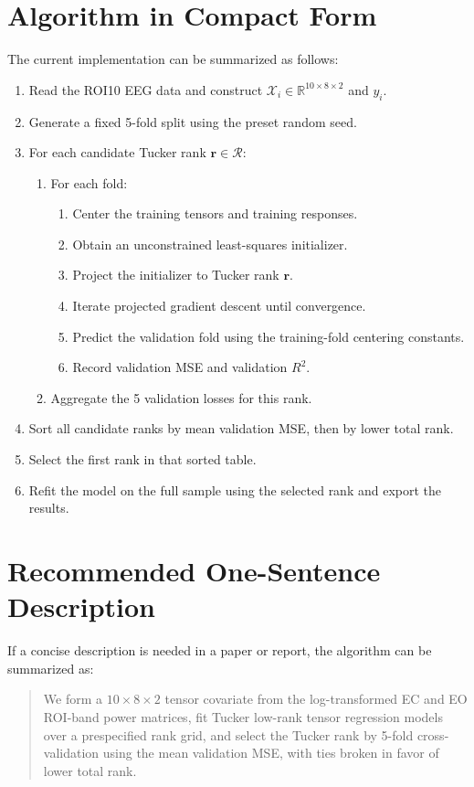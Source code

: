 \documentclass[11pt]{article}
\begin{document}
\section{Algorithm in Compact Form}
The current implementation can be summarized as follows:
\begin{enumerate}[leftmargin=2em,label=\arabic*.]
\item Read the ROI10 EEG data and construct $\mathcal X_i\in\mathbb{R}^{10\times 8\times 2}$ and $y_i$.
\item Generate a fixed 5-fold split using the preset random seed.
\item For each candidate Tucker rank $\mathbf r\in\mathcal R$:
\begin{enumerate}[leftmargin=2em,label*=\arabic*.]
\item For each fold:
\begin{enumerate}[leftmargin=2em,label*=\arabic*.]
\item Center the training tensors and training responses.
\item Obtain an unconstrained least-squares initializer.
\item Project the initializer to Tucker rank $\mathbf r$.
\item Iterate projected gradient descent until convergence.
\item Predict the validation fold using the training-fold centering constants.
\item Record validation MSE and validation $R^2$.
\end{enumerate}
\item Aggregate the 5 validation losses for this rank.
\end{enumerate}
\item Sort all candidate ranks by mean validation MSE, then by lower total rank.
\item Select the first rank in that sorted table.
\item Refit the model on the full sample using the selected rank and export the results.
\end{enumerate}

\section{Recommended One-Sentence Description}
If a concise description is needed in a paper or report, the algorithm can be summarized as:
\begin{quote}
We form a $10\times 8\times 2$ tensor covariate from the log-transformed EC and EO ROI-band power matrices, fit Tucker low-rank tensor regression models over a prespecified rank grid, and select the Tucker rank by 5-fold cross-validation using the mean validation MSE, with ties broken in favor of lower total rank.
\end{quote}
\end{document}
